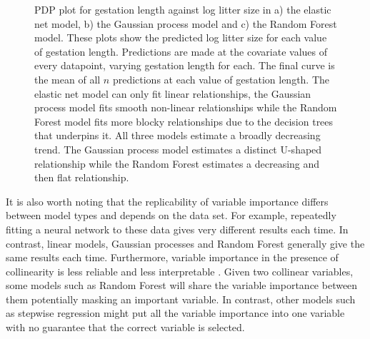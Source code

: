 \documentclass[12pt,]{article}
\begin{document}
\begin{figure}[t!]
  \centering

  \label{fig:pdp}
  \caption{
    PDP plot for gestation length against log litter size in a) the elastic net model, b) the Gaussian process model and c) the Random Forest model.
    These plots show the predicted log litter size for each value of gestation length.
    Predictions are made at the covariate values of every datapoint, varying gestation length for each.
    The final curve is the mean of all $n$ predictions at each value of gestation length.
    The elastic net model can only fit linear relationships, the Gaussian process model fits smooth non-linear relationships while the Random Forest model fits more blocky relationships due to the decision trees that underpins it.
    All three models estimate a broadly decreasing trend.
    The Gaussian process model estimates a distinct U-shaped relationship while the Random Forest estimates a decreasing and then flat relationship.
  }
\end{figure}

It is also worth noting that the replicability of variable importance differs between model types and depends on the data set.
For example, repeatedly fitting a neural network to these data gives very different results each time.
In contrast, linear models, Gaussian processes and Random Forest generally give the same results each time.
Furthermore, variable importance in the presence of collinearity is less reliable and less interpretable \citep{dormann2013collinearity}.
Given two collinear variables, some models such as Random Forest will share the variable importance between them potentially masking an important variable.
In contrast, other models such as stepwise regression might put all the variable importance into one variable with no guarantee that the correct variable is selected.
\end{document}
